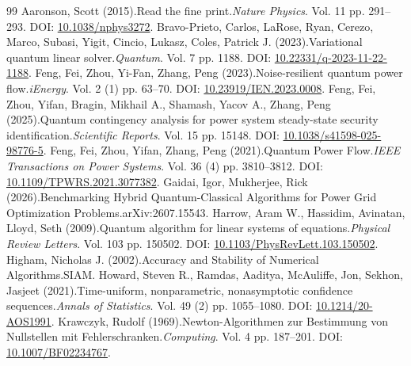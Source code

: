 \begin{thebibliography}{99}
\setlength{\itemsep}{1.6pt}
Aaronson, Scott (2015).\newblock Read the fine print.\newblock \emph{Nature Physics}. Vol. 11 pp. 291--293. DOI: \href{https://doi.org/10.1038/nphys3272}{10.1038/nphys3272}. 
Bravo-Prieto, Carlos, LaRose, Ryan, Cerezo, Marco, Subasi, Yigit, Cincio, Lukasz, Coles, Patrick J. (2023).\newblock Variational quantum linear solver.\newblock \emph{Quantum}. Vol. 7 pp. 1188. DOI: \href{https://doi.org/10.22331/q-2023-11-22-1188}{10.22331/q-2023-11-22-1188}. 
Feng, Fei, Zhou, Yi-Fan, Zhang, Peng (2023).\newblock Noise-resilient quantum power flow.\newblock \emph{iEnergy}. Vol. 2 (1) pp. 63--70. DOI: \href{https://doi.org/10.23919/IEN.2023.0008}{10.23919/IEN.2023.0008}. 
Feng, Fei, Zhou, Yifan, Bragin, Mikhail A., Shamash, Yacov A., Zhang, Peng (2025).\newblock Quantum contingency analysis for power system steady-state security identification.\newblock \emph{Scientific Reports}. Vol. 15 pp. 15148. DOI: \href{https://doi.org/10.1038/s41598-025-98776-5}{10.1038/s41598-025-98776-5}. 
Feng, Fei, Zhou, Yifan, Zhang, Peng (2021).\newblock Quantum Power Flow.\newblock \emph{IEEE Transactions on Power Systems}. Vol. 36 (4) pp. 3810--3812. DOI: \href{https://doi.org/10.1109/TPWRS.2021.3077382}{10.1109/TPWRS.2021.3077382}. 
Gaidai, Igor, Mukherjee, Rick (2026).\newblock Benchmarking Hybrid Quantum-Classical Algorithms for Power Grid Optimization Problems.\newblock arXiv:2607.15543. 
Harrow, Aram W., Hassidim, Avinatan, Lloyd, Seth (2009).\newblock Quantum algorithm for linear systems of equations.\newblock \emph{Physical Review Letters}. Vol. 103 pp. 150502. DOI: \href{https://doi.org/10.1103/PhysRevLett.103.150502}{10.1103/PhysRevLett.103.150502}. 
Higham, Nicholas J. (2002).\newblock Accuracy and Stability of Numerical Algorithms.\newblock SIAM. 
Howard, Steven R., Ramdas, Aaditya, McAuliffe, Jon, Sekhon, Jasjeet (2021).\newblock Time-uniform, nonparametric, nonasymptotic confidence sequences.\newblock \emph{Annals of Statistics}. Vol. 49 (2) pp. 1055--1080. DOI: \href{https://doi.org/10.1214/20-AOS1991}{10.1214/20-AOS1991}. 
Krawczyk, Rudolf (1969).\newblock Newton-Algorithmen zur Bestimmung von Nullstellen mit Fehlerschranken.\newblock \emph{Computing}. Vol. 4 pp. 187--201. DOI: \href{https://doi.org/10.1007/BF02234767}{10.1007/BF02234767}. 

\end{thebibliography}
